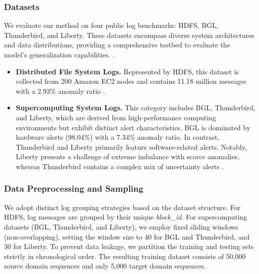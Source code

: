 \documentclass[lettersize,journal]{IEEEtran}
\begin{document}
\subsubsection{Datasets}
We evaluate our method on four public log benchmarks: HDFS, BGL, Thunderbird, and Liberty. These datasets encompass diverse system architectures and data distributions, providing a comprehensive testbed to evaluate the model's generalization capabilities. \cite{oliner2007supercomputers}.
\begin{itemize}
    \item \textbf{Distributed File System Logs.} Represented by HDFS, this dataset is collected from 200 Amazon EC2 nodes and contains 11.18 million messages with a 2.93\% anomaly ratio \cite{xu2009detecting}.
    
    \item \textbf{Supercomputing System Logs.} This category includes BGL, Thunderbird, and Liberty, which are derived from high-performance computing environments but exhibit distinct alert characteristics. 
    BGL is dominated by hardware alerts (98.04\%) with a 7.34\% anomaly ratio. 
    In contrast, Thunderbird and Liberty primarily feature software-related alerts. Notably, Liberty presents a challenge of extreme imbalance with scarce anomalies, whereas Thunderbird contains a complex mix of uncertainty alerts \cite{oliner2007supercomputers}.
\end{itemize}

\subsubsection{Data Preprocessing and Sampling}
We adopt distinct log grouping strategies based on the dataset structure. For HDFS, log messages are grouped by their unique \textit{block\_id}. For supercomputing datasets (BGL, Thunderbird, and Liberty), we employ fixed sliding windows (non-overlapping), setting the window size to 40 for BGL and Thunderbird, and 30 for Liberty. To prevent data leakage, we partition the training and testing sets strictly in chronological order. The resulting training dataset consists of 50,000 source domain sequences and only 5,000 target domain sequences.
\end{document}
